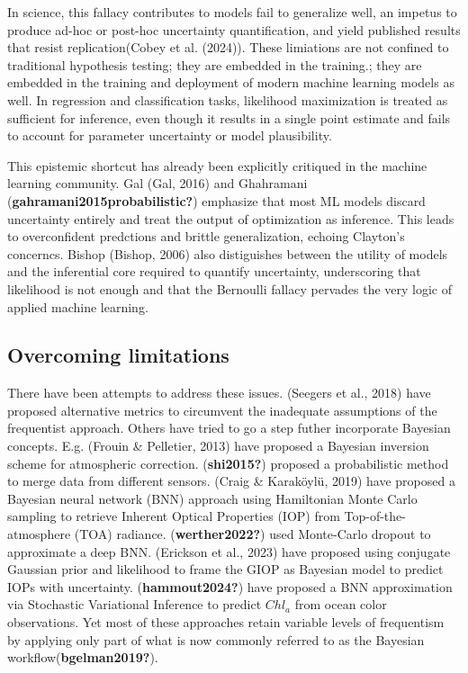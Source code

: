 \documentclass[
]{agujournal2019}
\begin{document}
In science, this fallacy contributes to models fail to generalize well,
an impetus to produce ad-hoc or post-hoc uncertainty quantification, and
yield published results that resist replication(Cobey et al. (2024)).
These limiations are not confined to traditional hypothesis testing;
they are embedded in the training.; they are embedded in the training
and deployment of modern machine learning models as well. In regression
and classification tasks, likelihood maximization is treated as
sufficient for inference, even though it results in a single point
estimate and fails to account for parameter uncertainty or model
plausibility.

This epistemic shortcut has already been explicitly critiqued in the
machine learning community. Gal (Gal, 2016) and Ghahramani
(\textbf{gahramani2015probabilistic?}) emphasize that most ML models
discard uncertainty entirely and treat the output of optimization as
inference. This leads to overconfident predctions and brittle
generalization, echoing Clayton's concerncs. Bishop (Bishop, 2006) also
distiguishes between the utility of models and the inferential core
required to quantify uncertainty, underscoring that likelihood is not
enough and that the Bernoulli fallacy pervades the very logic of applied
machine learning.

\subsection{Overcoming limitations}\label{overcoming-limitations}

There have been attempts to address these issues. (Seegers et al., 2018)
have proposed alternative metrics to circumvent the inadequate
assumptions of the frequentist approach. Others have tried to go a step
futher incorporate Bayesian concepts. E.g. (Frouin \& Pelletier, 2013)
have proposed a Bayesian inversion scheme for atmospheric correction.
(\textbf{shi2015?}) proposed a probabilistic method to merge data from
different sensors. (Craig \& Karaköylü, 2019) have proposed a Bayesian
neural network (BNN) approach using Hamiltonian Monte Carlo sampling to
retrieve Inherent Optical Properties (IOP) from Top-of-the-atmosphere
(TOA) radiance. (\textbf{werther2022?}) used Monte-Carlo dropout to
approximate a deep BNN. (Erickson et al., 2023) have proposed using
conjugate Gaussian prior and likelihood to frame the GIOP as Bayesian
model to predict IOPs with uncertainty. (\textbf{hammout2024?}) have
proposed a BNN approximation via Stochastic Variational Inference to
predict \(Chl_a\) from ocean color observations. Yet most of these
approaches retain variable levels of frequentism by applying only part
of what is now commonly referred to as the Bayesian
workflow(\textbf{bgelman2019?}).
\end{document}
